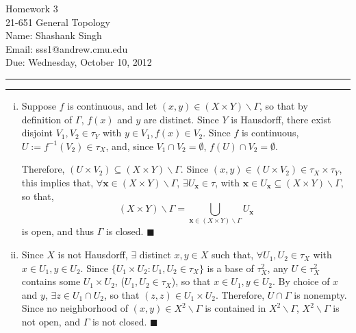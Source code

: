 \documentclass[11pt]{article}
\makeatletter
\newcounter{questionCounter}
\newcounter{partCounter}[questionCounter]
\newenvironment{question}[2][\arabic{questionCounter}]{%
    \setcounter{partCounter}{0}%
    \vspace{.25in} \hrule \vspace{0.5em}%
        \noindent{\bf #2}%
    \vspace{0.8em} \hrule \vspace{.10in}%
    \addtocounter{questionCounter}{1}%
}{}
\newcommand{\myname}{Shashank Singh}
\newcommand{\myandrew}{sss1@andrew.cmu.edu}
\newcommand{\myclass}{21-651 General Topology}
\newcommand{\myhwnum}{3}
\newcommand{\duedate}{Wednesday, October 10, 2012}
\renewcommand{\qed}{\quad $\blacksquare$}
\newcommand{\inv}{^{-1}}
\newcommand{\bx}{\mathbf{x}}
\newcommand{\sminus}{\backslash}
\makeatother
\begin{document}
\thispagestyle{plain}

{\Large Homework \myhwnum} \\
\myclass \\
Name: \myname \\
Email: \myandrew \\
Due: \duedate \\
\begin{question}{Problem 1}
\begin{enumerate}[(i)]
\item Suppose $f$ is continuous, and let
$(x,y) \in (X \times Y) \sminus \Gamma$, so that by definition of
$\Gamma$, $f(x)$ and $y$ are distinct. Since $Y$ is Hausdorff,
there exist disjoint $V_1,V_2 \in \tau_Y$ with $y \in V_1,f(x) \in V_2$.
Since $f$ is continuous, $U := f\inv(V_2) \in \tau_X$, and, since
$V_1 \cap V_2 = \emptyset$, $f(U) \cap V_2 = \emptyset$.

Therefore, $(U \times V_2) \subseteq (X \times Y) \sminus \Gamma$.
Since $(x,y) \in (U \times V_2) \in \tau_X \times \tau_Y$, this implies
that, $\forall \bx \in (X \times Y) \sminus \Gamma$,
$\exists U_{\bx} \in \tau$, with
$\bx \in U_{\bx} \subseteq (X \times Y) \sminus \Gamma$, so that,
\[(X \times Y) \sminus \Gamma
 = \bigcup_{\bx \in (X \times Y) \sminus \Gamma} U_{\bx}\]
is open, and thus $\Gamma$ is closed. \qed

\item Since $X$ is not Hausdorff, $\exists$ distinct $x,y \in X$ such that,
$\forall U_1,U_2 \in \tau_X$ with $x \in U_1,y \in U_2$. Since
$\{U_1 \times U_2 : U_1,U_2 \in \tau_X\}$ is a base of $\tau_X^2$, any
$U \in \tau_X^2$ contains some $U_1 \times U_2$, ($U_1,U_2 \in \tau_X$),
so that $x \in U_1,y \in U_2$. By choice of $x$ and $y$,
$\exists z \in U_1 \cap U_2$, so that $(z,z) \in U_1 \times U_2$.
Therefore, $U \cap \Gamma$ is nonempty. Since no neighborhood of
$(x,y) \in X^2 \sminus \Gamma$  is contained in $X^2 \sminus \Gamma$,
$X^2 \sminus \Gamma$ is not open, and $\Gamma$ is not closed. \qed

\end{enumerate}
\end{question}
\end{document}

